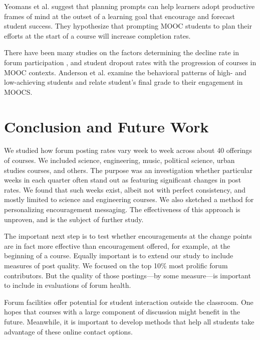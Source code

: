 Yeomans et al. \cite{Yeomans} suggest that planning prompts can help
learners adopt productive frames of mind at the outset of a learning
goal that encourage and forecast student success. They hypothesize
that prompting MOOC students to plan their efforts at the start of a
course will increase completion rates.

There have been many studies on the factors determining the decline
rate in forum participation \cite{DBLP}, and student dropout rates
\cite{Yang_peerinfluence} with the progression of courses in MOOC
contexts. Anderson et al. \cite{DBLP:journals/corr/AndersonHKL14}
examine the behavioral patterns of high- and low-achieving students
and relate student’s final grade to their engagement in MOOCS.

\section{Conclusion and Future Work}

We studied how forum posting rates vary week to week across about 40
offerings of courses. We included science, engineering, music,
political science, urban studies courses, and others. The purpose was
an investigation whether particular weeks in each quarter often stand
out as featuring significant changes in post rates. We found that such
weeks exist, albeit not with perfect consistency, and mostly limited
to science and engineering courses. We also sketched a method for
personalizing encouragement messaging. The effectiveness of this
approach is unproven, and is the subject of further study.

The important next step is to test whether encouragements at the
change points are in fact more effective than encouragement offered,
for example, at the beginning of a course. Equally important is to
extend our study to include measures of post quality. We focused on
the top 10\% most prolific forum contributors. But the quality of
those postings---by some measure---is important to include in
evaluations of forum health.

Forum facilities offer potential for student interaction outside the
classroom. One hopes that courses with a large component of discussion
might benefit in the future. Meanwhile, it is important to develop
methods that help all students take advantage of these online contact
options. 




